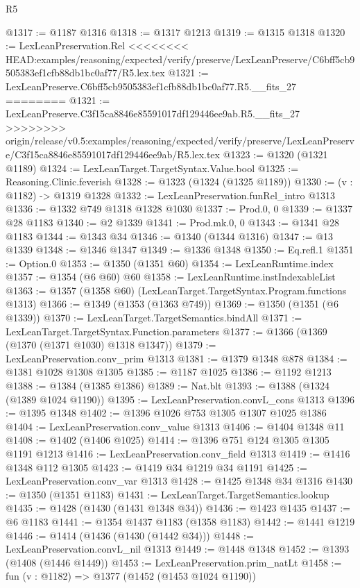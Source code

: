 \begin{lexlean}{R5}
\begin{coremodule}
{{{{{{{{{{{{{{{{{{{{{{{{{{{{{{{{{{{{{{{{{{{{{{{{{{{{{{{{{{{{{{{{{{{{{{{{{{{{{{{{{{{{@1317 := @1187 @1316
@1318 := @1317 @1213
@1319 := @1315 @1318
@1320 := LexLeanPreservation.Rel
<<<<<<<< HEAD:examples/reasoning/expected/verify/preserve/LexLeanPreserve/C6bff5cb9505383ef1cfb88db1bc0af77/R5.lex.tex
@1321 := LexLeanPreserve.C6bff5cb9505383ef1cfb88db1bc0af77.R5.__fits_27
========
@1321 := LexLeanPreserve.C3f15ca8846e85591017df129446ee9ab.R5.__fits_27
>>>>>>>> origin/release/v0.5:examples/reasoning/expected/verify/preserve/LexLeanPreserve/C3f15ca8846e85591017df129446ee9ab/R5.lex.tex
@1323 := @1320 (@1321 @1189)
@1324 := LexLeanTarget.TargetSyntax.Value.bool
@1325 := Reasoning.Clinic.feverish
@1328 := @1323 (@1324 (@1325 @1189))
@1330 := (v : @1182) -> @1319 @1328
@1332 := LexLeanPreservation.funRel_intro @1313
@1336 := @1332 @749 @1318 @1328 @1030
@1337 := Prod.{0, 0}
@1339 := @1337 @28 @1183
@1340 := @2 @1339
@1341 := Prod.mk.{0, 0}
@1343 := @1341 @28 @1183
@1344 := @1343 @34
@1346 := @1340 (@1344 @1316)
@1347 := @13 @1339
@1348 := @1346 @1347
@1349 := @1336 @1348
@1350 := Eq.refl.{1}
@1351 := Option.{0}
@1353 := @1350 (@1351 @60)
@1354 := LexLeanRuntime.index
@1357 := @1354 (@6 @60) @60
@1358 := LexLeanRuntime.instIndexableList
@1363 := @1357 (@1358 @60) (LexLeanTarget.TargetSyntax.Program.functions @1313)
@1366 := @1349 (@1353 (@1363 @749))
@1369 := @1350 (@1351 (@6 @1339))
@1370 := LexLeanTarget.TargetSemantics.bindAll
@1371 := LexLeanTarget.TargetSyntax.Function.parameters
@1377 := @1366 (@1369 (@1370 (@1371 @1030) @1318 @1347))
@1379 := LexLeanPreservation.conv_prim @1313
@1381 := @1379 @1348 @878
@1384 := @1381 @1028 @1308 @1305
@1385 := @1187 @1025
@1386 := @1192 @1213
@1388 := @1384 (@1385 @1386)
@1389 := Nat.blt
@1393 := @1388 (@1324 (@1389 @1024 @1190))
@1395 := LexLeanPreservation.convL_cons @1313
@1396 := @1395 @1348
@1402 := @1396 @1026 @753 @1305 @1307 @1025 @1386
@1404 := LexLeanPreservation.conv_value @1313
@1406 := @1404 @1348 @11
@1408 := @1402 (@1406 @1025)
@1414 := @1396 @751 @124 @1305 @1305 @1191 @1213
@1416 := LexLeanPreservation.conv_field @1313
@1419 := @1416 @1348 @112 @1305
@1423 := @1419 @34 @1219 @34 @1191
@1425 := LexLeanPreservation.conv_var @1313
@1428 := @1425 @1348 @34 @1316
@1430 := @1350 (@1351 @1183)
@1431 := LexLeanTarget.TargetSemantics.lookup
@1435 := @1428 (@1430 (@1431 @1348 @34))
@1436 := @1423 @1435
@1437 := @6 @1183
@1441 := @1354 @1437 @1183 (@1358 @1183)
@1442 := @1441 @1219
@1446 := @1414 (@1436 (@1430 (@1442 @34)))
@1448 := LexLeanPreservation.convL_nil @1313
@1449 := @1448 @1348
@1452 := @1393 (@1408 (@1446 @1449))
@1453 := LexLeanPreservation.prim_natLt
@1458 := fun (v : @1182) => @1377 (@1452 (@1453 @1024 @1190))
}}}}}}}}}}}}}}}}}}}}}}}}}}}}}}}}}}}}}}}}}}}}}}}}}}}}}}}}}}}}}}}}}}}}}}}}}}}}}}}}}}}}
\end{coremodule}
\end{lexlean}
